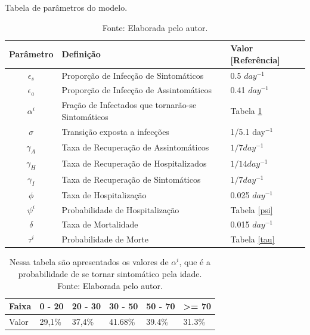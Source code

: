 \begin{table}[H]
  \caption{Tabela de parâmetros do modelo.}
  \begin{tabular}{cll}
  Parâmetro & Definição & Valor [Referência] \\
  \hline
  \rowcolor{Gray}
  $\epsilon_s$ & Proporção de Infecção de Sintomáticos & 0.5 $day^{-1}$\\
  $\epsilon_a$ & Proporção de Infecção de Assintomáticos& 0.41 $day^{-1}$\\ 
  \rowcolor{Gray}
  $\alpha^i$   & Fração de Infectados que tornarão-se Sintomáticos & Tabela \ref{alpha} \cite{Jung2020}\\
  $\sigma$     & Transição exposta a infecções& 1/5.1 day$^{-1}$\\
  \rowcolor{Gray}
  $\gamma_A$   & Taxa de Recuperação de Assintomáticos& $1/7 day^{-1}$\\
  $\gamma_H$   & Taxa de Recuperação de Hospitalizados& $1/14 day^{-1}$\\
  \rowcolor{Gray}
  $\gamma_I$   & Taxa de Recuperação de Sintomáticos & $1/7 day^{-1}$\\
  $\phi$     & Taxa de Hospitalização & 0.025 $day^{-1}$\\
  \rowcolor{Gray}
  $\psi^i$   & Probabilidade de Hospitalização & Tabela \ref{psi}\\
  $\delta$   & Taxa de Mortalidade & 0.015 $day^{-1}$\\
  \rowcolor{Gray}
  $\tau^i$   & Probabilidade de Morte & Tabela \ref{tau}
  \end{tabular}

  \caption*{Fonte: Elaborada pelo autor.}

\end{table}


\begin{table}[H]
  \centering
  \begin{tabular}{llllll}
  Faixa & 0 - 20 & 20 - 30 & 30 - 50 & 50 - 70 & \textgreater{}= 70 \\
  \hline
  Valor & 29,1\% & 37,4\%  & 41.68\% & 39.4\%  & 31.3\%            
  \end{tabular}

  \caption{Nessa tabela são apresentados os valores de $\alpha^i$, que é a probabilidade de se tornar sintomático pela idade. \\Fonte: Elaborada pelo autor.}

  \label{alpha}

\end{table}


